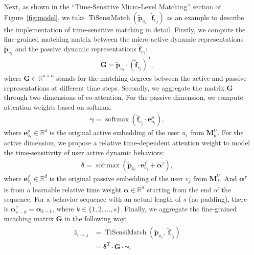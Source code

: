 Next, as shown in the ``Time-Sensitive Micro-Level Matching'' section of Figure~\ref{fig:model}, we take $\operatorname{TiSensiMatch} \left(\widetilde{\bm{p}}_{u_i}, \ \widetilde{\bm{f}}_{v_j}\right)$ as an example to describe the implementation of time-sensitive matching in detail. 
Firstly, we compute the fine-grained matching matrix between the micro active dynamic representations $\widetilde{\bm{p}}_{u_i}$ and the passive dynamic representations $\widetilde{\bm{f}}_{v_j}$:
\begin{align}
    \bm{G} = \widetilde{\bm{p}}_{u_i} \cdot {(\widetilde{\bm{f}}_{v_j})}^{T},
\end{align}
where $\bm{G} \in \mathbb{R}^{n \times n}$ stands for the matching degrees between the active and passive representations at different time steps. 
Secondly, we aggregate the matrix $\bm{G}$ through two dimensions of co-attention. For the passive dimension, we compute attention weights based on softmax:
\begin{align}
    \bm{\gamma} = \operatorname{softmax}(\widetilde{\bm{f}}_{v_j} \cdot \bm{e}^{p}_{u_i}),
\end{align}
where $\bm{e}^{p}_{u_i} \in \mathbb{R}^{d}$ is the original active embedding of the user $u_i$ from $\bm{M}^{U}_{p}$. For the active dimension, we propose a relative time-dependent attention weight to model the time-sensitivity of user active dynamic behaviors:
\begin{align}
    \bm{\delta} = \operatorname{softmax}(\widetilde{\bm{p}}_{u_i} \cdot \bm{e}^{f}_{v_j} + \bm{\alpha}^{\tau}),
\end{align}
where $\bm{e}^{f}_{v_j} \in \mathbb{R}^{d}$ is the original passive embedding of the user $v_j$ from $\bm{M}^{V}_{f}$. 
And $\bm{\alpha}^{\tau}$ is from a learnable relative time weight $\bm{\alpha} \in \mathbb{R}^{n}$ starting from the end of the sequence. 
For a behavior sequence with an actual length of $s$ (no padding), there is $\bm{\alpha}^{\tau}_{s-k} = \bm{\alpha}_{k-1}$, where $k\in\{1,2,\ldots,s\}$. 
Finally, we aggregate the fine-grained matching matrix $\bm{G}$ in the following way:
\begin{align}
\begin{split}
     {\hat{z}}_{i \rightarrow j} &= \operatorname{TiSensiMatch} \left(\widetilde{\bm{p}}_{u_i}, \ \widetilde{\bm{f}}_{v_j}\right) \\
    & =  {\bm{\delta}}^{T} \cdot \bm{G} \cdot \bm{\gamma}.
\end{split}
\label{eq:agg}
\end{align}

